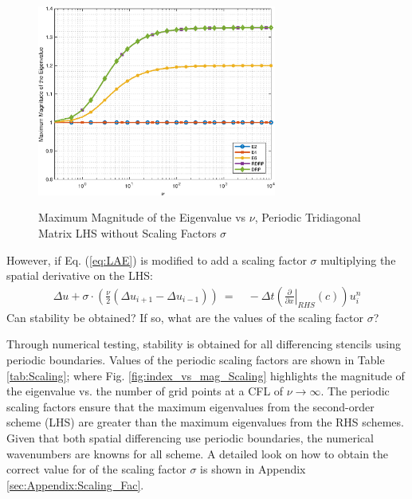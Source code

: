 \documentclass[conf]{new-aiaa}
\begin{document}
\begin{figure}[hbtp!]
	\centering
	{\includegraphics[width=0.7\textwidth]{Figures/nu_vs_magnitude}}
	\caption{Maximum Magnitude of the Eigenvalue vs $\nu$, 
	Periodic Tridiagonal Matrix LHS without Scaling Factors $\sigma$}
	\label{fig:nu_vs_magnitude}
\end{figure}
However, if Eq. (\ref{eq:LAE}) is modified to add a scaling factor $\sigma$ multiplying the spatial derivative on the LHS:
\begin{equation}
	\begin{split}
		\label{eq:LAE_Scaling}
  			\Delta{u}+\sigma\cdot\left(\frac{\nu}{2}\left(\Delta{u_{i+1}}-\Delta{u_{i-1}} \right)\right)~=&~-\Delta{t}\left(\left.\frac{\partial}{\partial{x}}\right|_{RHS}\left(c\right)\right) {u}_i^{n}
	\end{split}
\end{equation}
Can stability be obtained? If so, what are the values of the scaling factor $\sigma$? 

Through numerical testing, stability is obtained for all differencing stencils using periodic boundaries. 
Values of the periodic scaling factors are shown in Table \ref{tab:Scaling}; where Fig. \ref{fig:index_vs_mag_Scaling} highlights the magnitude of the eigenvalue vs. the number of grid points at a CFL of $\nu\to\infty$. 
The periodic scaling factors ensure that the maximum eigenvalues from the second-order scheme (LHS) are greater than the maximum eigenvalues from the RHS schemes. 
Given that both spatial differencing use periodic boundaries, the numerical wavenumbers are knowns for all scheme. 
A detailed look on how to obtain the correct value for of the scaling factor $\sigma$ is shown in Appendix \ref{sec:Appendix:Scaling_Fac}. 
\end{document}
